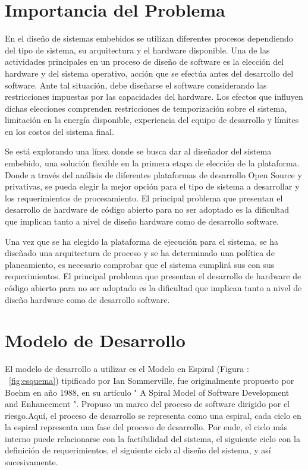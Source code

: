 \section{Importancia del Problema}
\par 
En el diseño de sistemas embebidos se utilizan diferentes procesos dependiendo del tipo de sistema, su arquitectura y el hardware disponible. Una de
las actividades principales en un proceso de diseño de software es la elección del hardware y del sistema operativo, acción que se efectúa antes del
desarrollo del software. Ante tal situación, debe diseñarse el software considerando las restricciones impuestas por las capacidades del hardware.
Los efectos que influyen dichas elecciones comprenden restricciones de temporización sobre el sistema, limitación en la energía disponible,
experiencia del equipo de desarrollo y límites en los costos del sistema final.
\vspace{0.5cm}
\par  
Se está explorando una línea donde se busca dar al diseñador del sistema embebido, una solución flexible en la primera etapa de elección de
la plataforma. Donde a través del análisis de diferentes plataformas de desarrollo Open Source y privativas, se pueda elegir la mejor opción para el
tipo de sistema a desarrollar y los requerimientos de procesamiento. El principal problema que presentan el desarrollo de hardware de código abierto para
no ser adoptado es la dificultad que implican tanto a nivel de diseño hardware como de desarrollo software. 
\vspace{0.5cm}
\par  
Una vez que se ha elegido la plataforma de ejecución para el sistema, se ha diseñado una arquitectura de proceso y se ha determinado una política de
planeamiento, es necesario comprobar que el sistema cumplirá sus con sus requerimientos. El principal problema que presentan el desarrollo de
hardware de código abierto para no ser adoptado es la dificultad que implican tanto a nivel de diseño hardware como de desarrollo software.

\section{Modelo de Desarrollo}
\par
El modelo de desarrollo a utilizar es el Modelo en Espiral (Figura : ~\ref{fig:esquema}) tipificado por Ian Sommerville\cite{Etiqueta00}, fue
originalmente propuesto por Boehm en año 1988, en su artículo " A Spiral Model of Software Development and Enhancement ". Propuso un marco del
proceso de software dirigido por el riesgo.Aquí, el proceso de desarrollo se representa como una espiral, cada ciclo en la espiral representa una
fase del proceso de desarrollo. Por ende, el ciclo más interno puede relacionarse con la factibilidad del sistema, el siguiente ciclo con la
definición de requerimientos, el siguiente ciclo al diseño del sistema, y así sucesivamente. 

